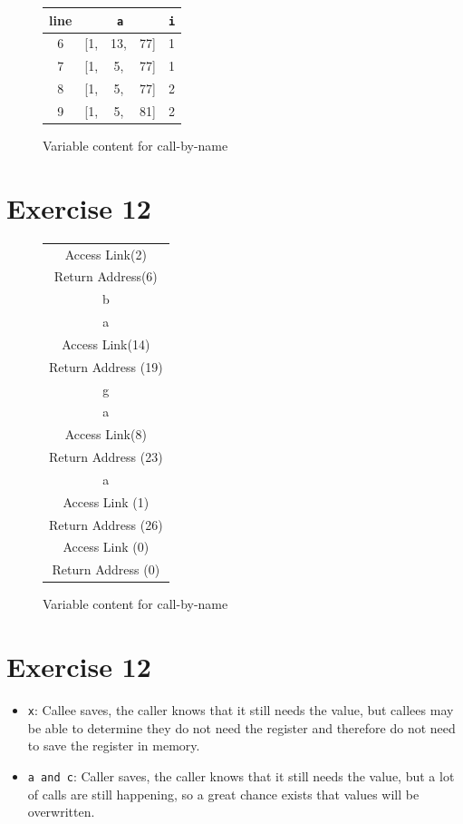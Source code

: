 \documentclass[11pt]{article} %
\begin{document}
\begin{figure}[H]
\centering
\begin{tabular}{ccccc}
line & \multicolumn{3}{c}{\texttt{a}} & \texttt{i} \\ 
\hline 
6 & [1, & 13, & 77] & 1 \\ 
7 & [1, & 5, & 77] & 1 \\ 
8 & [1, & 5, & 77] & 2 \\ 
9 & [1, & 5, & 81] & 2 \\ 
\hline 
\end{tabular} 
\caption{Variable content for call-by-name}
\end{figure}

\section*{Exercise 12}
\begin{figure}[H]
\centering
\begin{tabular}{|c|}
\hline 
Access Link(2) \\ 
Return Address(6) \\ 
b \\ 
\hline 
a \\ 
Access Link(14) \\ 
Return Address (19) \\ 
g \\ 
\hline 
a \\ 
Access Link(8) \\ 
Return Address (23) \\
\hline
a \\ 
Access Link (1) \\ 
Return Address (26) \\ 
\hline
Access Link (0) \\ 
Return Address (0) \\ 
\hline 
\end{tabular} 
\caption{Variable content for call-by-name}
\end{figure}

\section*{Exercise 12}

\begin{itemize}
\item \texttt{x}: Callee saves, the caller knows that it still needs the value, but callees may be able to determine they do not need the register and therefore do not need to save the register in memory.
\item \texttt{a and c}: Caller saves, the caller knows that it still needs the value, but a lot of calls are still happening, so a great chance exists that values will be overwritten.
\end{itemize}
\end{document}
